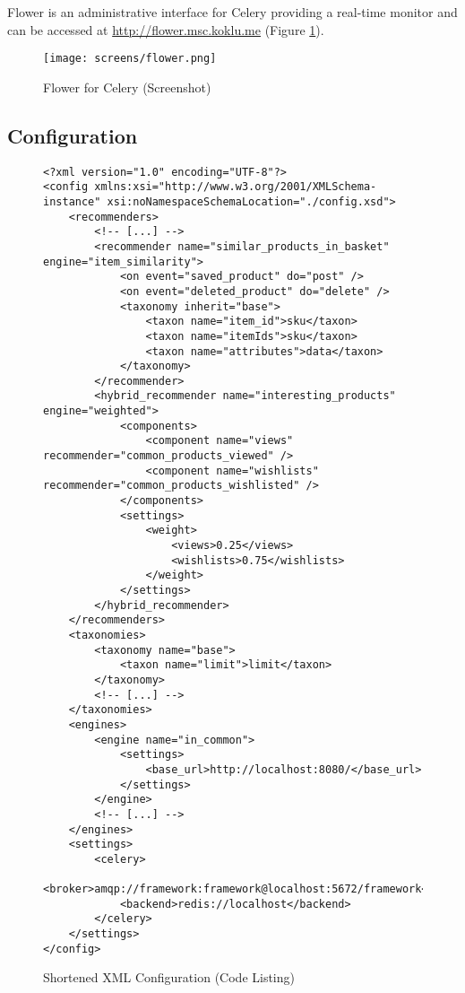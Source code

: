 Flower is an administrative interface for Celery providing a real-time monitor and can be accessed at \url{http://flower.msc.koklu.me} (Figure \ref{fig:implementation-framework-flower}).

\begin{figure}[ht]
    \texttt{[image: screens/flower.png]}
    \caption{Flower for Celery (Screenshot)}
    \label{fig:implementation-framework-flower}
\end{figure}

\subsection{Configuration}

\begin{figure}[ht!]
    \begin{verbatim}
<?xml version="1.0" encoding="UTF-8"?>
<config xmlns:xsi="http://www.w3.org/2001/XMLSchema-instance" xsi:noNamespaceSchemaLocation="./config.xsd">
    <recommenders>
        <!-- [...] -->
        <recommender name="similar_products_in_basket" engine="item_similarity">
            <on event="saved_product" do="post" />
            <on event="deleted_product" do="delete" />
            <taxonomy inherit="base">
                <taxon name="item_id">sku</taxon>
                <taxon name="itemIds">sku</taxon>
                <taxon name="attributes">data</taxon>
            </taxonomy>
        </recommender>
        <hybrid_recommender name="interesting_products" engine="weighted">
            <components>
                <component name="views" recommender="common_products_viewed" />
                <component name="wishlists" recommender="common_products_wishlisted" />
            </components>
            <settings>
                <weight>
                    <views>0.25</views>
                    <wishlists>0.75</wishlists>
                </weight>
            </settings>
        </hybrid_recommender>
    </recommenders>
    <taxonomies>
        <taxonomy name="base">
            <taxon name="limit">limit</taxon>
        </taxonomy>
        <!-- [...] -->
    </taxonomies>
    <engines>
        <engine name="in_common">
            <settings>
                <base_url>http://localhost:8080/</base_url>
            </settings>
        </engine>
        <!-- [...] -->
    </engines>
    <settings>
        <celery>
            <broker>amqp://framework:framework@localhost:5672/framework</broker>
            <backend>redis://localhost</backend>
        </celery>
    </settings>
</config>
    \end{verbatim}
    \caption{Shortened XML Configuration (Code Listing)}
    \label{fig:implementation-framework-configuration}
\end{figure}

